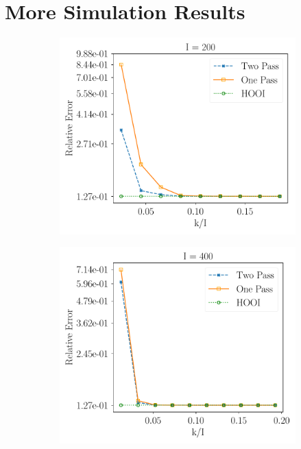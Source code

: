 \section{More Simulation Results}\label{appendix: more_result}

\begin{figure}[H] 
\centering 
    \centering 
    \begin{subfigure}{0.32\textwidth}
    \includegraphics[scale = 0.3]{figure/fpd_n200.pdf}
    \end{subfigure}
    \begin{subfigure}{0.32\textwidth}
    \includegraphics[scale = 0.3]{figure/fpd_n400.pdf}

\end{subfigure}
\end{figure}

